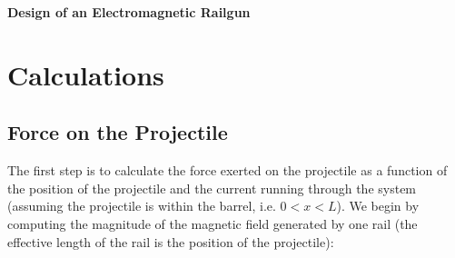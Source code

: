 \documentclass[12pt]{article}
\begin{document}
\begin{center}
    \textbf{\LARGE{Design of an Electromagnetic Railgun}} \\
\end{center}


\section{Calculations}

\subsection{Force on the Projectile}

The first step is to calculate the force exerted on the projectile as a function of the position of the projectile and the current running through the system (assuming the projectile is within the barrel, i.e. $0 < x < L$). We begin by computing the magnitude of the magnetic field generated by one rail (the effective length of the rail is the position of the projectile): \\

\begin{center}
\end{center}
\end{document}
